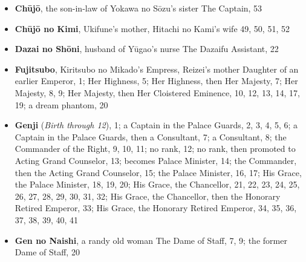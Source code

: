 \documentclass{article}
\begin{document}
\begin{multicols}{2}
\begin{itemize}[
			label=,
			leftmargin=0em,
			rightmargin=-1.5em,
			itemindent=-2em,
			nosep,
		]
		\item \textbf{Chūjō}, the son-in-law of Yokawa no Sōzu's sister The Captain, 53

		\item \textbf{Chūjō no Kimi}, Ukifune's mother, Hitachi no Kami's wife 49, 50, 51, 52

		\item \textbf{Dazai no Shōni}, husband of Yūgao's nurse The Dazaifu Assistant, 22

		\item \textbf{Fujitsubo}, Kiritsubo no Mikado's Empress, Reizei's mother Daughter of an earlier Emperor, 1;
		      Her Highness, 5;
		      Her Highness, then Her Majesty, 7;
		      Her Majesty, 8, 9;
		      Her Majesty, then Her Cloistered Eminence, 10, 12, 13, 14, 17, 19;
		      a dream phantom, 20

		\item \textbf{Genji} (\textit{Birth through 12}), 1;
		      a Captain in the Palace Guards, 2, 3, 4, 5, 6;
		      a Captain in the Palace Guards, then a Consultant, 7;
		      a Consultant, 8;
		      the Commander of the Right, 9, 10, 11;
		      no rank, 12;
		      no rank, then promoted to Acting Grand Counselor, 13;
		      becomes Palace Minister, 14;
		      the Commander, then the Acting Grand Counselor, 15;
		      the Palace Minister, 16, 17;
		      His Grace, the Palace Minister, 18, 19, 20;
		      His Grace, the Chancellor, 21, 22, 23, 24, 25, 26, 27, 28, 29, 30, 31, 32;
		      His Grace, the Chancellor, then the Honorary Retired Emperor, 33;
		      His Grace, the Honorary Retired Emperor, 34, 35, 36, 37, 38, 39, 40, 41

		\item \textbf{Gen no Naishi}, a randy old woman The Dame of Staff, 7, 9;
		      the former Dame of Staff, 20


\end{itemize}
\end{multicols}
\end{document}

